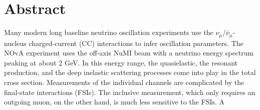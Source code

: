 \documentclass[12pt,letterpaper,oneside,openright]{book}
\begin{document}
\chapter*{\centering Abstract}
Many modern long baseline neutrino oscillation experiments use the $\nu_\mu$/$\bar{\nu}_\mu$-nucleus charged-current (CC) interactions to infer oscillation parameters. The NOvA experiment uses the off-axis NuMI beam with a neutrino energy spectrum peaking at about 2 GeV. In this energy range, the quasielastic, the resonant production, and the deep inelastic scattering processes come into play in the total cross section. Measurements of the individual channels are complicated by the final-state interactions (FSIs). The inclusive measurement, which only requires an outgoing muon, on the other hand, is much less sensitive to the FSIs. A 
\end{document}
